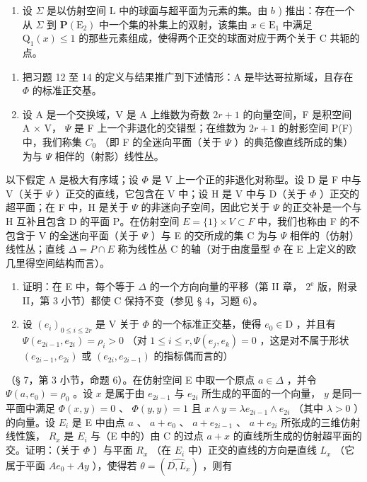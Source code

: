 \begin{enumerate}
\def\labelenumi{\alph{enumi})}
\setcounter{enumi}{3}
\tightlist
\item
  设 \(\Sigma\) 是以仿射空间 L 中的球面与超平面为元素的集。由 \(b\) ) 推出：存在一个从 \(\Sigma\) 到 \(\mathbf{P}(\mathrm{E}_2)\) 中一个集的补集上的双射，该集由 \(x \in \mathrm{E}_1\) 中满足 \(\mathrm{Q}_1(x) \leqslant 1\) 的那些元素组成，使得两个正交的球面对应于两个关于 C 共轭的点。
\end{enumerate}

\begin{enumerate}
\def\labelenumi{\arabic{enumi})}
\setcounter{enumi}{14}
\item
  把习题 12 至 14 的定义与结果推广到下述情形：A 是毕达哥拉斯域，且存在 \(\Phi\) 的标准正交基。
\item
  设 A 是一个交换域，V 是 A 上维数为奇数 \(2r + 1\) 的向量空间，F 是积空间 A × V， \(\Psi\) 是 F 上一个非退化的交错型；在维数为 \(2r + 1\) 的射影空间 P(F) 中，我们称集 \(C_{0}\) （即 F 的全迷向平面（关于 \(\Psi\) ）的典范像直线所成的集）为与 \(\Psi\) 相伴的（射影）线性丛。
\end{enumerate}

以下假定 A 是极大有序域；设 \(\Phi\) 是 V 上一个正的非退化对称型。设 D 是 F 中与 V（关于 \(\Psi\) ）正交的直线，它包含在 V 中；设 H 是 V 中与 D（关于 \(\Phi\) ）正交的超平面；在 F 中，H 是关于 \(\Psi\) 的非迷向子空间，因此它关于 \(\Psi\) 的正交补是一个与 H 互补且包含 D 的平面 P。在仿射空间 \(E = \{1\} \times V \subset F\) 中，我们也称由 F 的不包含于 V 的全迷向平面（关于 \(\Psi\) ）与 E 的交所成的集 C 为与 \(\Psi\) 相伴的（仿射）线性丛；直线 \(\Delta = P \cap E\) 称为线性丛 C 的轴（对于由度量型 \(\Phi\) 在 E 上定义的欧几里得空间结构而言）。

\begin{enumerate}
\def\labelenumi{\alph{enumi})}
\item
  证明：在 E 中，每个等于 \(\Delta\) 的一个方向向量的平移（第 II 章， \(2^{\text{e}}\) 版，附录 II，第 3 小节）都使 C 保持不变（参见 § 4，习题 6）。
\item
  设 \((e_i)_{0\leqslant i\leqslant 2r}\) 是 V 关于 \(\Phi\) 的一个标准正交基，使得 \(e_0\in \mathrm{D}\) ，并且有 \(\Psi (e_{2i - 1},e_{2i}) = \rho_{i} > 0\) （对 \(1\leqslant i\leqslant r,\Psi (e_j,e_k) = 0\) ，这是对不属于形状 \((e_{2i - 1},e_{2i})\) 或 \((e_{2i},e_{2i - 1})\) 的指标偶而言的）
\end{enumerate}

（§ 7，第 3 小节，命题 6）。在仿射空间 E 中取一个原点 \(a \in \Delta\) ，并令 \(\Psi(a, e_0) = \rho_0\) 。设 \(x\) 是属于由 \(e_{2i-1}\) 与 \(e_{2i}\) 所生成的平面的一个向量， \(y\) 是同一平面中满足 \(\Phi(x, y) = 0\) 、 \(\Phi(y, y) = 1\) 且 \(x \wedge y = \lambda e_{2i-1} \wedge e_{2i}\) （其中 \(\lambda > 0\) ）的向量。设 \(E_i\) 是 E 中由点 \(a\) 、 \(a + e_0\) 、 \(a + e_{2i-1}\) 、 \(a + e_{2i}\) 所张成的三维仿射线性簇， \(R_x\) 是 \(E_i\) 与（E 中的）由 C 的过点 \(a + x\) 的直线所生成的仿射超平面的交。证明：（关于 \(\Phi\) ）与平面 \(R_x\) （在 \(E_i\) 中）正交的直线的方向是直线 \(L_x\) （它属于平面 \(Ae_0 + Ay\) ），使得若 \(\theta = (\widehat{D, L_x})\) ，则有

